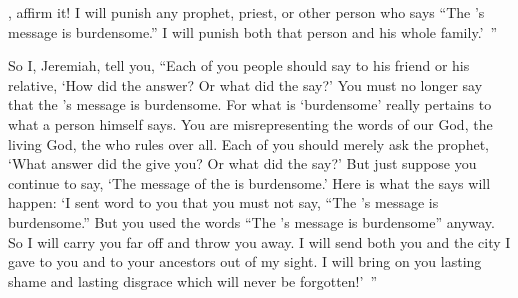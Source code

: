 {{}, affirm it!
I will punish any prophet,
priest,
or other
person who
says
“The
{}’s
message is burdensome.”
I will punish
both that person
and his whole family.’ ”
\par }{\PP {}So I, Jeremiah, tell
you, “Each
of you people should say to his friend
or
his relative,
‘How
did the
{}
answer? Or what
did the
{}
say?’
You must no longer
say that the
{}’s
message
is burdensome.
For
what is ‘burdensome’
really pertains to what
a person
himself says.
You are misrepresenting
the
words
of our God,
the living
God,
the {}
who rules over all.
Each
of you should merely
ask the prophet,
‘What
answer
did the
{}
give you? Or what
did the
{}
say?’
But
just suppose you continue
to say, ‘The message
of the {}
is burdensome.’ Here
is what
the {}
says
will happen: ‘I sent
word to
you that
you must not
say,
“The
{}’s
message is burdensome.”
But you used the words
“The
{}’s
message
is burdensome” anyway.
So
I
will carry you far off and throw
you
away. I
will send both you and the
city
I gave
to you and to your ancestors
out
of my sight.
I will bring
on
you lasting
shame
and lasting
disgrace which
will never
be forgotten!’ ”

}
